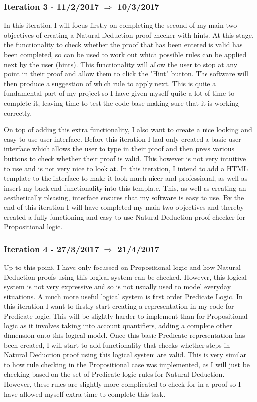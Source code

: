 \subsubsection{Iteration 3 - 11/2/2017 $\Rightarrow$ 10/3/2017}

In this iteration I will focus firstly on completing the second of my main two objectives of creating a Natural Deduction proof checker with hints. At this stage, the functionality to check whether the proof that has been entered is valid has been completed, so can be used to work out which possible rules can be applied next by the user (hints). This functionality will allow the user to stop at any point in their proof and allow them to click the "Hint" button. The software will then produce a suggestion of which rule to apply next. This is quite a fundamental part of my project so I have given myself quite a lot of time to complete it, leaving time to test the code-base making sure that it is working correctly.

On top of adding this extra functionality, I also want to create a nice looking and easy to use user interface. Before this iteration I had only created a basic user interface which allows the user to type in their proof and then press various buttons to check whether their proof is valid. This however is not very intuitive to use and is not very nice to look at. In this iteration, I intend to add a HTML template to the interface to make it look much nicer and professional, as well as insert my back-end functionality into this template. This, as well as creating an aesthetically pleasing, interface ensures that my software is easy to use. By the end of this iteration I will have completed my main two objectives and thereby created a fully functioning and easy to use Natural Deduction proof checker for Propositional logic.

\subsubsection{Iteration 4 - 27/3/2017 $\Rightarrow$ 21/4/2017}

Up to this point, I have only focussed on Propositional logic and how Natural Deduction proofs using this logical system can be checked. However, this logical system is not very expressive and so is not usually used to model everyday situations. A much more useful logical system is first order Predicate Logic. In this iteration I want to firstly start creating a representation in my code for Predicate logic. This will be slightly harder to implement than for Propositional logic as it involves taking into account quantifiers, adding a complete other dimension onto this logical model. Once this basic Predicate representation has been created, I will start to add functionality that checks whether steps in Natural Deduction proof using this logical system are valid. This is very similar to how rule checking in the Propositional case was implemented,  as I will just be checking based on the set of Predicate logic rules for Natural Deduction. However, these rules are slightly more complicated to check for in a proof so I have allowed myself extra time to complete this task. 

